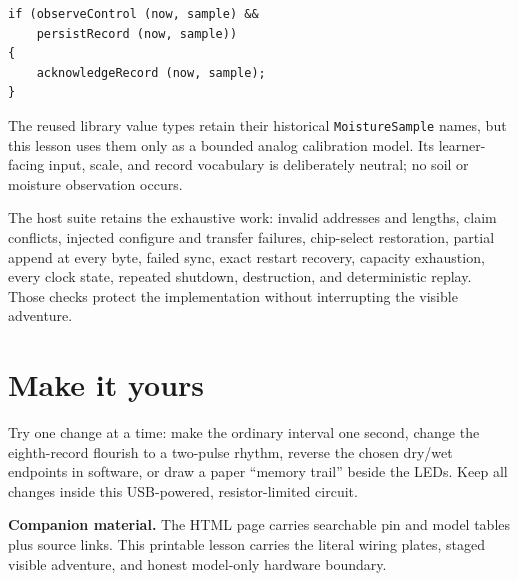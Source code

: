 \documentclass[11pt]{article}
\begin{document}
\begin{lstlisting}[style=adkcpp]
if (observeControl (now, sample) &&
    persistRecord (now, sample))
{
    acknowledgeRecord (now, sample);
}
\end{lstlisting}

The reused library value types retain their historical
\texttt{MoistureSample} names, but this lesson uses them only as a bounded
analog calibration model. Its learner-facing input, scale, and record
vocabulary is deliberately neutral; no soil or moisture observation occurs.

The host suite retains the exhaustive work: invalid addresses and lengths,
claim conflicts, injected configure and transfer failures, chip-select
restoration, partial append at every byte, failed sync, exact restart
recovery, capacity exhaustion, every clock state, repeated shutdown,
destruction, and deterministic replay. Those checks protect the implementation
without interrupting the visible adventure.

\section*{Make it yours}

Try one change at a time: make the ordinary interval one second, change the
eighth-record flourish to a two-pulse rhythm, reverse the chosen dry/wet
endpoints in software, or draw a paper ``memory trail'' beside the LEDs.
Keep all changes inside this USB-powered, resistor-limited circuit.

\vfill\small
\textbf{Companion material.} The HTML page carries searchable pin and model
tables plus source links. This printable lesson carries the literal wiring
plates, staged visible adventure, and honest model-only hardware boundary.
\end{document}
